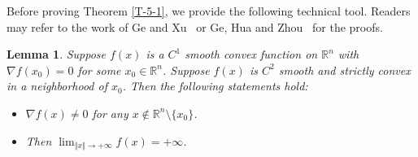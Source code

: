 \documentclass[11pt,leqno]{article}
\numberwithin{equation}{section}
\newtheorem{lemma}[theorem]{Lemma}
\theoremstyle{definition}
\begin{document}
Before proving Theorem \ref{T-5-1}, we provide the following technical tool. Readers may refer to the work of Ge and Xu~\cite[Lemma 4.6]{MR3806817} or Ge, Hua and Zhou~\cite[Lemma. 3.6]{MR4235204} for the proofs.
\begin{lemma}\label{L-5-1}
Suppose $f(x)$ is a $C^{1}$ smooth convex function on $\mathbb{R}^{n}$ with $\nabla f(x_{0})=0$ for some $x_{0}\in\mathbb{R}^{n}$. Suppose $f(x)$ is $C^{2}$ smooth and strictly convex in a neighborhood of $x_{0}$. Then the following statements hold:
\begin{itemize}
\item[($a$)] $\nabla f(x)\neq0$ for any $x\notin\mathbb{R}^{n}\setminus\{x_{0}\}$.
\item[$(b)$] Then $\lim_{\Vert x\Vert\to+\infty}f(x)=+\infty$.
\end{itemize}
\end{lemma}
\end{document}
